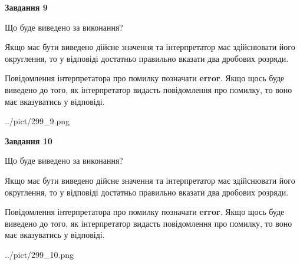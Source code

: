\documentclass[12pt, ukrainian]{article}
\begin{document}
{\begin {Large}
{\begin {center}\textbf{Завдання 9}\end {center}}\par
Що буде виведено за виконання? \par

Якщо має бути виведено дійсне значення та інтерпретатор має здійснювати його округлення, 
то у відповіді достатньо правильно вказати два дробових розряди.

Повідомлення інтерпретатора про помилку позначати \textbf{error}.
Якщо щось буде виведено до того, як інтерпретатор видасть повідомлення про помилку, 
то воно має вказуватись у відповіді. \par

\begin{center}
	{../pict/299_9.png}
\end{center}
\newpage

{\begin {center}\textbf{Завдання 10}\end {center}}\par
Що буде виведено за виконання? \par

Якщо має бути виведено дійсне значення та інтерпретатор має здійснювати його округлення, 
то у відповіді достатньо правильно вказати два дробових розряди.

Повідомлення інтерпретатора про помилку позначати \textbf{error}.
Якщо щось буде виведено до того, як інтерпретатор видасть повідомлення про помилку, 
то воно має вказуватись у відповіді. \par

\begin{center}
	{../pict/299_10.png}
\end{center}
\newpage

\end {Large}}
\end{document}
